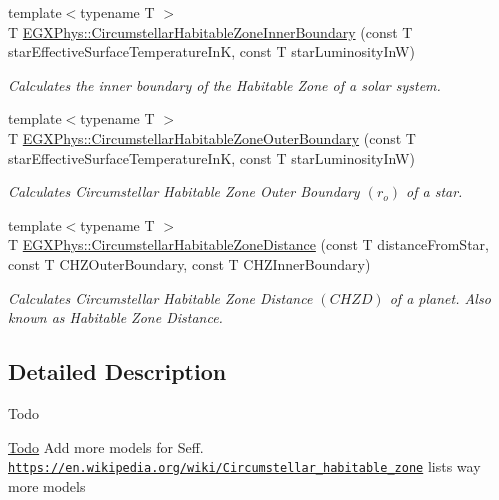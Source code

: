 \begin{DoxyCompactItemize}
{\footnotesize template$<$typename T $>$ }\\T \mbox{\hyperlink{group___e_g_x_phys-_circumstellar_habitable_zone_limit_gab31a33d0dbd3ecd00537832b5b836d73}{E\+G\+X\+Phys\+::\+Circumstellar\+Habitable\+Zone\+Inner\+Boundary}} (const T star\+Effective\+Surface\+Temperature\+InK, const T star\+Luminosity\+InW)
\begin{DoxyCompactList}\small\item\em Calculates the inner boundary of the Habitable Zone of a solar system. \end{DoxyCompactList}\item 
{\footnotesize template$<$typename T $>$ }\\T \mbox{\hyperlink{group___e_g_x_phys-_circumstellar_habitable_zone_limit_ga3a6dbbdaddddd071cb1f0a20e40d83bd}{E\+G\+X\+Phys\+::\+Circumstellar\+Habitable\+Zone\+Outer\+Boundary}} (const T star\+Effective\+Surface\+Temperature\+InK, const T star\+Luminosity\+InW)
\begin{DoxyCompactList}\small\item\em Calculates Circumstellar Habitable Zone Outer Boundary $(r_o)$ of a star. \end{DoxyCompactList}\item 
{\footnotesize template$<$typename T $>$ }\\T \mbox{\hyperlink{group___e_g_x_phys-_circumstellar_habitable_zone_limit_ga3247e5fe14db39121ce622207af172fd}{E\+G\+X\+Phys\+::\+Circumstellar\+Habitable\+Zone\+Distance}} (const T distance\+From\+Star, const T C\+H\+Z\+Outer\+Boundary, const T C\+H\+Z\+Inner\+Boundary)
\begin{DoxyCompactList}\small\item\em Calculates Circumstellar Habitable Zone Distance $(CHZD)$ of a planet. Also known as Habitable Zone Distance. \end{DoxyCompactList}\end{DoxyCompactItemize}


\subsection{Detailed Description}
\begin{DoxyRefDesc}{Todo}
\item[\mbox{\hyperlink{todo__todo000001}{Todo}}]Add more models for Seff. \href{https://en.wikipedia.org/wiki/Circumstellar_habitable_zone}{\tt https\+://en.\+wikipedia.\+org/wiki/\+Circumstellar\+\_\+habitable\+\_\+zone} lists way more models \end{DoxyRefDesc}


